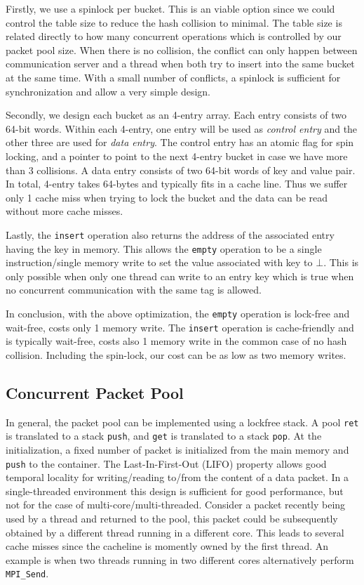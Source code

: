 Firstly, we use a spinlock per bucket. This is an viable option since we could
control the table size to reduce the hash collision to minimal. The table size is
related directly to how many concurrent operations which is controlled by 
our packet pool size. When there is no collision, the conflict can only happen
between communication server and a thread when both try to insert into the same
bucket at the same time. With a small number of conflicts, a spinlock is
sufficient for synchronization and allow a very simple design.

Secondly, we design each bucket as an 4-entry array. Each entry consists of two
64-bit words. Within each 4-entry, one entry will be used as \textit{control
entry} and the other three are used for \textit{data entry}. The control entry
has an atomic flag for spin locking, and a pointer to point to the next 4-entry
bucket in case we have more than 3 collisions. A data entry consists of two
64-bit words of key and value pair. In total, 4-entry takes 64-bytes and
typically fits in a cache line. Thus we suffer only 1 cache miss when trying to
lock the bucket and the data can be read without more cache misses.

Lastly, the \texttt{insert} operation also returns the address of the
associated entry having the key in memory. This allows the \texttt{empty}
operation to be a single instruction/single memory write to set the value
associated with key to $\bot$. This is only possible when only one thread can
write to an entry key which is true when no concurrent communication with the
same tag is allowed.

In conclusion, with the above optimization, the \texttt{empty} operation is
lock-free and wait-free, costs only 1 memory write. The \texttt{insert}
operation is cache-friendly and is typically wait-free, costs also 1 memory
write in the common case of no hash collision. Including the spin-lock,
our cost can be as low as two memory writes.

\subsection{Concurrent Packet Pool}
In general, the packet pool can be implemented using a lockfree stack. A pool
\texttt{ret} is translated to a stack \texttt{push}, and \texttt{get} is
translated to a stack \texttt{pop}. At the initialization, a fixed number of
packet is initialized from the main memory and \texttt{push} to the container.
The Last-In-First-Out (LIFO) property allows good temporal locality for
writing/reading to/from the content of a data packet. In a single-threaded
environment this design is sufficient for good performance, but not for the
case of multi-core/multi-threaded. Consider a packet recently being used by a thread
and returned to the pool, this packet could be subsequently obtained by a different thread
running in a different core. This leads to several cache misses since the cacheline
is momently owned by the first thread. An example is when two threads running in 
two different cores alternatively perform \texttt{MPI_Send}.

